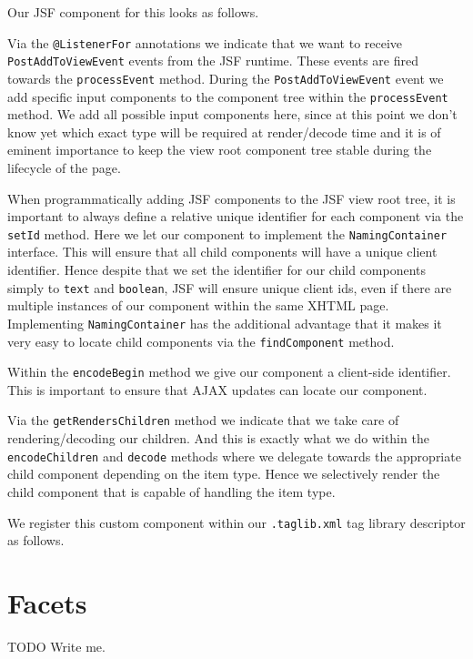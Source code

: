 Our JSF component for this looks as follows.

Via the \texttt{@ListenerFor} annotations we indicate that we want to receive \texttt{PostAddToViewEvent} events from the JSF runtime.
These events are fired towards the \texttt{processEvent} method.
During the \texttt{PostAddToViewEvent} event we add specific input components to the component tree within the \texttt{processEvent} method.
We add all possible input components here,  since at this point we don't know yet which exact type will be required at render/decode time and it is of eminent importance to keep the view root component tree stable during the lifecycle of the page.

When programmatically adding JSF components to the JSF view root tree, it is important to always define a relative unique identifier for each component via the \texttt{setId} method.
Here we let our component to implement the \texttt{NamingContainer} interface.
This will ensure that all child components will have a unique client identifier.
Hence despite that we set the identifier for our child components simply to \texttt{text} and \texttt{boolean}, JSF will ensure unique client ids, even if there are multiple instances of our component within the same XHTML page.
Implementing \texttt{NamingContainer} has the additional advantage that it makes it very easy to locate child components via the \texttt{findComponent} method.

Within the \texttt{encodeBegin} method we give our component a client-side identifier.
This is important to ensure that AJAX updates can locate our component.

Via the \texttt{getRendersChildren} method we indicate that we take care of rendering/decoding our children.
And this is exactly what we do within the \texttt{encodeChildren} and \texttt{decode} methods where we delegate towards the appropriate child component depending on the item type.
Hence we selectively render the child component that is capable of handling the item type.

We register this custom component within our \texttt{.taglib.xml} tag library descriptor as follows.


\section{Facets}
\begin{TODO}{TODO}
	Write me.
\end{TODO}

